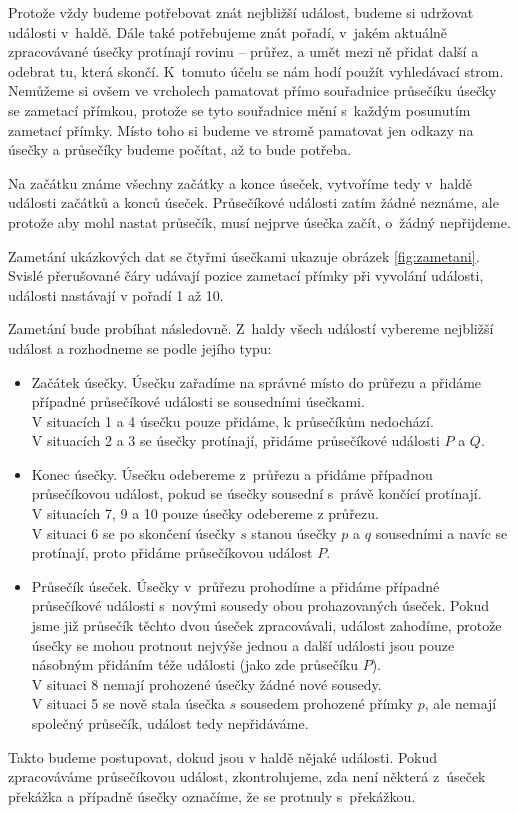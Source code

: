 Protože vždy budeme potřebovat znát nejbližší událost, budeme si udržovat
události v~haldě. Dále také potřebujeme znát pořadí, v~jakém aktuálně
zpracovávané úsečky protínají rovinu -- průřez, a umět mezi ně přidat další a
odebrat tu, která skončí. K~tomuto účelu se nám hodí použít vyhledávací strom.
Nemůžeme si ovšem ve vrcholech pamatovat přímo souřadnice průsečíku úsečky se
zametací přímkou, protože se tyto souřadnice mění s~každým posunutím zametací
přímky. Místo toho si budeme ve stromě pamatovat jen odkazy na úsečky a průsečíky
budeme počítat, až to bude potřeba.

Na začátku známe všechny začátky a konce úseček, vytvoříme tedy v~haldě události
začátků a konců úseček. Průsečíkové události zatím žádné neznáme, ale protože
aby mohl nastat průsečík, musí nejprve úsečka začít, o~žádný nepřijdeme.

Zametání ukázkových dat se čtyřmi úsečkami ukazuje obrázek \ref{fig:zametani}.
Svislé přerušované čáry udávají pozice zametací přímky při vyvolání události,
události nastávají v pořadí 1 až 10.

Zametání bude probíhat následovně. Z~haldy všech událostí vybereme nejbližší
událost a rozhodneme se podle jejího typu:
\begin{itemize}
	\item {\tuc Začátek úsečky.}  Úsečku zařadíme na správné místo do
	průřezu a přidáme případné průsečíkové události se sousedními
	úsečkami.\\
	V situacích 1 a 4 úsečku pouze přidáme, k průsečíkům nedochází.\\
	V situacích 2 a 3 se úsečky protínají, přidáme průsečíkové události
	$P$ a $Q$.

	\item {\tuc Konec úsečky.} Úsečku odebereme z~průřezu a přidáme
	případnou průsečíkovou událost, pokud se úsečky sousední s~právě
	končící protínají.\\
	V situacích 7, 9 a 10 pouze úsečky odebereme z průřezu.\\
	V situaci 6 se po skončení úsečky $s$ stanou úsečky $p$ a $q$ sousedními
	a navíc se protínají, proto přidáme průsečíkovou událost $P$.
	\item {\tuc Průsečík úseček.} Úsečky v~průřezu prohodíme a přidáme
	případné průsečíkové události s~novými sousedy obou prohazovaných 
	úseček. Pokud jsme již průsečík těchto dvou úseček zpracovávali, událost
	zahodíme, protože úsečky se mohou protnout nejvýše jednou a další události
	jsou pouze násobným přidáním téže události (jako zde průsečíku $P$).\\
	V situaci 8 nemají prohozené úsečky žádné nové sousedy.\\
	V situaci 5 se nově stala úsečka $s$ sousedem prohozené přímky $p$, ale
	nemají společný průsečík, událost tedy nepřidáváme.
\end{itemize}
Takto budeme postupovat, dokud jsou v haldě nějaké události. Pokud zpracováváme 
průsečíkovou událost, zkontrolujeme, zda není některá z~úseček překážka a 
případně úsečky označíme, že se protnuly s~překážkou. 


